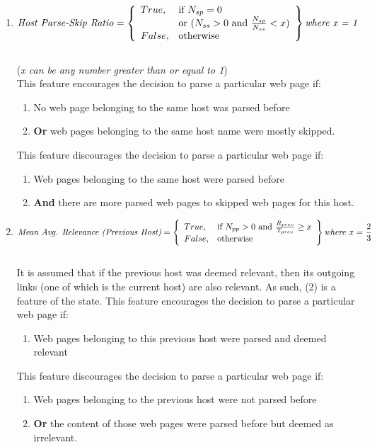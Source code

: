 \documentclass{article}
\begin{document}
\begin{enumerate}
	\item %
\[
	\text{\textit{Host Parse-Skip Ratio}} = \left\{\begin{array}{ll}
		True,	& \text{if }  N_{sp} = 0 \\
				& \text{or } (N_{ss} > 0 \text{ and }\frac{N_{sp}}{N_{ss}} < x) \\
		False,	& \text{otherwise}
	\end{array}\right\} \textit{where x = 1}
\] \\ (\textit{x can be any number greater than or equal to 1}) \\ This feature encourages the decision to parse a particular web page if:
	\begin{enumerate}
		\item No web page belonging to the same host was parsed before
		\item \textbf{Or} web pages belonging to the same host name were mostly skipped.
	\end{enumerate}
	This feature discourages the decision to parse a particular web page if:
	\begin{enumerate}
		\item Web pages belonging to the same host were parsed before
		\item \textbf{And} there are more parsed web pages to skipped web pages for this host.
	\end{enumerate}

	\item %
\[
	\text{\textit{Mean Avg. Relevance (Previous Host)}} = \left\{\begin{array}{ll}
		True,	& \text{if }  N_{pp} > 0 \text{ and }\frac{R_{prev}}{T_{prev}} \geq x \\
		False,	& \text{otherwise}
	\end{array}\right\} \textit{where x = $ \frac{2}{3} $}
\] \\ It is assumed that if the previous host was deemed relevant, then its outgoing links (one of which is the current host) are also relevant. As such, (2) is a feature of the state. This feature encourages the decision to parse a particular web page if:
	\begin{enumerate}
		\item Web pages belonging to this previous host were parsed and deemed relevant
	\end{enumerate}
	This feature discourages the decision to parse a particular web page if:
	\begin{enumerate}
		\item Web pages belonging to the previous host were not parsed before
		\item \textbf{Or} the content of those web pages were parsed before but deemed as irrelevant.
	\end{enumerate}


\end{enumerate}
\end{document}
